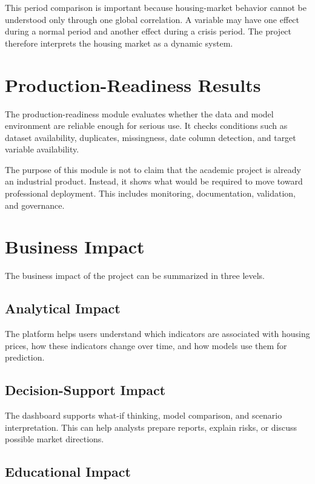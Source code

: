 This period comparison is important because housing-market behavior cannot be understood only through one global correlation. A variable may have one effect during a normal period and another effect during a crisis period. The project therefore interprets the housing market as a dynamic system.

\section{Production-Readiness Results}

The production-readiness module evaluates whether the data and model environment are reliable enough for serious use. It checks conditions such as dataset availability, duplicates, missingness, date column detection, and target variable availability.

The purpose of this module is not to claim that the academic project is already an industrial product. Instead, it shows what would be required to move toward professional deployment. This includes monitoring, documentation, validation, and governance.

\section{Business Impact}

The business impact of the project can be summarized in three levels.

\subsection{Analytical Impact}

The platform helps users understand which indicators are associated with housing prices, how these indicators change over time, and how models use them for prediction.

\subsection{Decision-Support Impact}

The dashboard supports what-if thinking, model comparison, and scenario interpretation. This can help analysts prepare reports, explain risks, or discuss possible market directions.

\subsection{Educational Impact}

